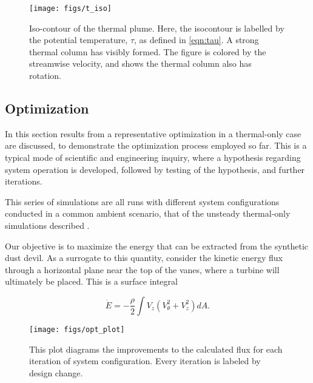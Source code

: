 %
%
  \begin{figure}[!htb]
   \begin{center}
    \texttt{[image: figs/t\_iso]}
    \caption{Iso-contour of the thermal plume. Here, the isocontour is
    labelled by the potential temperature, $\tau$, as defined in
    \ref{eqn:tau}. A strong thermal column has visibly formed. The
    figure is colored by the streamwise velocity, and shows the thermal
    column also has rotation.} 
    \label{fig:field_real}
   \end{center}
  \end{figure}

\subsection{Optimization}

In this section results from a representative optimization
in a thermal-only case are discussed, to demonstrate the optimization 
process employed so far. This is a typical mode of scientific and
engineering inquiry, where a hypothesis regarding system operation is
developed, followed by testing of the hypothesis, and further
iterations.  

This series of simulations are all runs with different system
configurations conducted in a common ambient scenario, that of the
unsteady thermal-only simulations described . 

Our objective is to maximize the energy that can be 
extracted from the synthetic dust devil. As a surrogate to this
quantity, consider the kinetic energy flux through a horizontal plane
near the top of the vanes, where a turbine will ultimately be
placed. This is a surface integral\cite{landau1959fm}


 \begin{equation}
 \dot E = -\frac{\rho }{2} \int V_z (V_{\theta}^2 + V_z^2 ) dA.
 \end{equation}

\begin{figure}[htb]
 \centering
 \texttt{[image: figs/opt\_plot]}
 \caption{This plot diagrams the improvements to the calculated flux for  
 each iteration of system configuration. Every iteration is labeled by
 design change.}
 \label{fig:opt_plot}
\end{figure}


